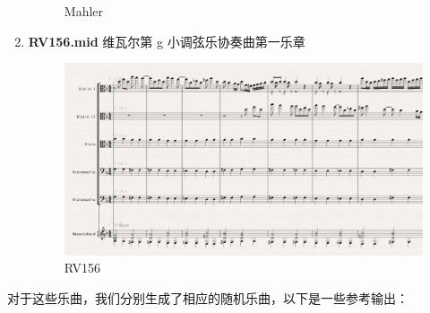 \documentclass[11pt]{article}
\begin{document}
\begin{enumerate}
\begin{figure}[hptb]
	\caption{Mahler}
\end{figure}
\item \textbf{RV156.mid} 维瓦尔第 g 小调弦乐协奏曲第一乐章
\begin{figure}[hptb]
	\centering
	\label{fig:RV156}
	\includegraphics[width=\textwidth]{pic/RV156.eps}
	\caption{RV156}
\end{figure}
\end{enumerate}
对于这些乐曲，我们分别生成了相应的随机乐曲，以下是一些参考输出：
\end{document}
